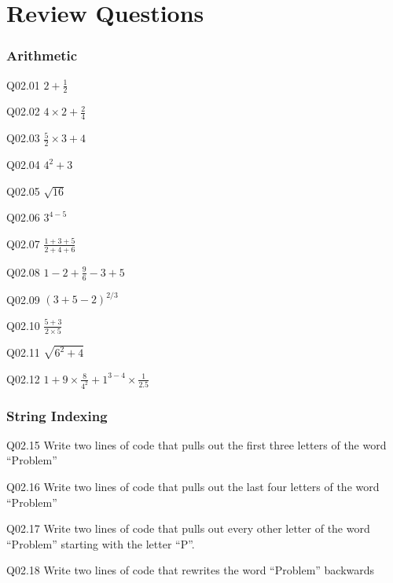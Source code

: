 \documentclass{book}
\newenvironment{problems}{}{}  %
\begin{document}
    
        \section{Review Questions}\label{review-questions}
    




    
        \begin{problems}
        \subsubsection{Arithmetic}\label{arithmetic}

Q02.01 \(2 + \frac{1}{2}\)

Q02.02 \(4 \times 2 + \frac{2}{4}\)

Q02.03 \(\frac{5}{2} \times 3 + 4\)

Q02.04 \(4^2 + 3\)

Q02.05 \(\sqrt{16}\)

Q02.06 \(3^{4-5}\)

Q02.07 \(\frac{1+3+5}{2+4+6}\)

Q02.08 \(1 - 2 + \frac{9}{6} -3 + 5\)

Q02.09 \((3 + 5 -2)^{2/3}\)

Q02.10 \(\frac{5+3}{2 \times 5}\)

Q02.11 \(\sqrt{6^2 + 4}\)

Q02.12 \(1 + 9 \times \frac{8}{4^2} + 1^{3-4} \times \frac{1}{2.5}\)
        \end{problems}

    




    
        \subsubsection{String Indexing}\label{string-indexing}

Q02.15 Write two lines of code that pulls out the first three letters of
the word ``Problem''

Q02.16 Write two lines of code that pulls out the last four letters of
the word ``Problem''

Q02.17 Write two lines of code that pulls out every other letter of the
word ``Problem'' starting with the letter ``P''.

Q02.18 Write two lines of code that rewrites the word ``Problem''
backwards
    
\end{document}
